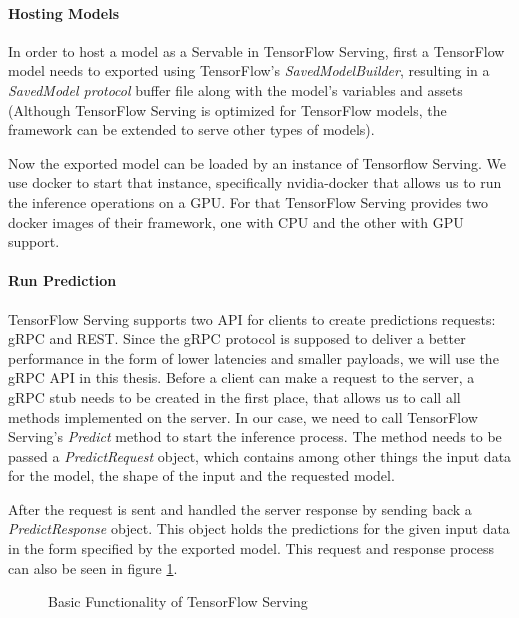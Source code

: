 \paragraph{Hosting Models}
In order to host a model as a Servable in TensorFlow Serving, first a TensorFlow model needs to exported using TensorFlow's \emph{SavedModelBuilder}, resulting in a \emph{SavedModel protocol} buffer file along with the model’s variables and assets (Although TensorFlow Serving is optimized for TensorFlow models, the framework can be extended to serve other types of models).

Now the exported model can be loaded by an instance of Tensorflow Serving.
We use docker to start that instance, specifically nvidia-docker that allows us to run the inference operations on a GPU. For that TensorFlow Serving provides two docker images of their framework, one with CPU and the other with GPU support.

\paragraph{Run Prediction}
TensorFlow Serving supports two API for clients to create predictions requests: gRPC and REST. Since the gRPC protocol is supposed to deliver a better performance in the form of lower latencies and smaller payloads, we will use the gRPC API in this thesis.
Before a client can make a request to the server, a gRPC stub needs to be created in the first place, that allows us to call all methods implemented on the server. In our case, we need to call TensorFlow Serving's \emph{Predict} method to start the inference process. The method needs to be passed a \emph{PredictRequest} object, which contains among other things the input data for the model, the shape of the input and the requested model.%

After the request is sent and handled the server response by sending back a \emph{PredictResponse} object. This object holds the predictions for the given input data in the form specified by the exported model.
This request and response process can also be seen in figure \ref{fig:cloud}.

\begin{figure}[H]
\centering

\caption{Basic Functionality of TensorFlow Serving}
\label{fig:cloud}
\end{figure}
 
